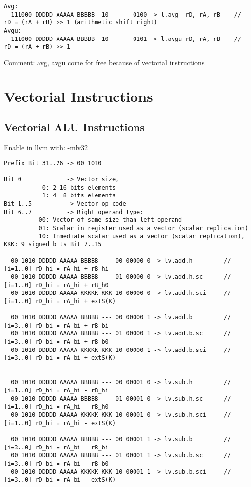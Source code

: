 \begin{landscape}
\begin{verbatim}
Avg:
  111000 DDDDD AAAAA BBBBB -10 -- -- 0100 -> l.avg  rD, rA, rB    // rD = (rA + rB) >> 1 (arithmetic shift right)
Avgu:
  111000 DDDDD AAAAA BBBBB -10 -- -- 0101 -> l.avgu rD, rA, rB    // rD = (rA + rB) >> 1
\end{verbatim}

Comment: avg, avgu come for free because of vectorial instructions


\newpage
\section{Vectorial Instructions}
\subsection{Vectorial ALU Instructions}
Enable in llvm with: -mlv32

\begin{verbatim}
Prefix Bit 31..26 -> 00 1010

Bit 0             -> Vector size,
           0: 2 16 bits elements
           1: 4  8 bits elements
Bit 1..5          -> Vector op code
Bit 6..7          -> Right operand type:
          00: Vector of same size than left operand
          01: Scalar in register used as a vector (scalar replication)
          10: Immediate scalar used as a vector (scalar replication), KKK: 9 signed bits Bit 7..15

  00 1010 DDDDD AAAAA BBBBB --- 00 00000 0 -> lv.add.h         // [i=1..0] rD_hi = rA_hi + rB_hi
  00 1010 DDDDD AAAAA BBBBB --- 01 00000 0 -> lv.add.h.sc      // [i=1..0] rD_hi = rA_hi + rB_h0
  00 1010 DDDDD AAAAA KKKKK KKK 10 00000 0 -> lv.add.h.sci     // [i=1..0] rD_hi = rA_hi + extS(K)

  00 1010 DDDDD AAAAA BBBBB --- 00 00000 1 -> lv.add.b         // [i=3..0] rD_bi = rA_bi + rB_bi
  00 1010 DDDDD AAAAA BBBBB --- 01 00000 1 -> lv.add.b.sc      // [i=3..0] rD_bi = rA_bi + rB_b0
  00 1010 DDDDD AAAAA KKKKK KKK 10 00000 1 -> lv.add.b.sci     // [i=3..0] rD_bi = rA_bi + extS(K)


  00 1010 DDDDD AAAAA BBBBB --- 00 00001 0 -> lv.sub.h         // [i=1..0] rD_hi = rA_hi - rB_hi
  00 1010 DDDDD AAAAA BBBBB --- 01 00001 0 -> lv.sub.h.sc      // [i=1..0] rD_hi = rA_hi - rB_h0
  00 1010 DDDDD AAAAA KKKKK KKK 10 00001 0 -> lv.sub.h.sci     // [i=1..0] rD_hi = rA_hi - extS(K)

  00 1010 DDDDD AAAAA BBBBB --- 00 00001 1 -> lv.sub.b         // [i=3..0] rD_bi = rA_bi - rB_bi
  00 1010 DDDDD AAAAA BBBBB --- 01 00001 1 -> lv.sub.b.sc      // [i=3..0] rD_bi = rA_bi - rB_b0
  00 1010 DDDDD AAAAA KKKKK KKK 10 00001 1 -> lv.sub.b.sci     // [i=3..0] rD_bi = rA_bi - extS(K)



\end{verbatim}
\end{landscape}
